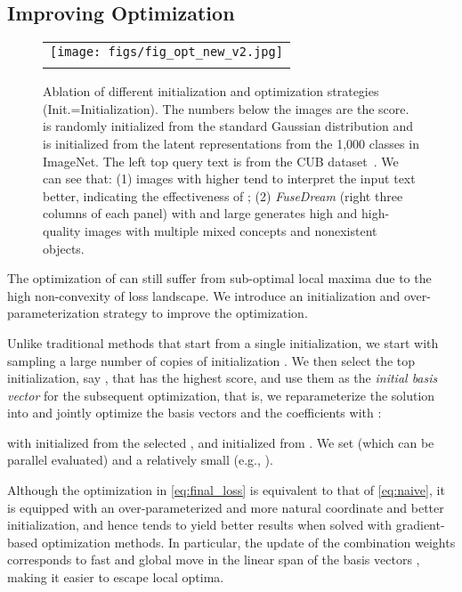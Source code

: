 \documentclass[10pt,twocolumn,letterpaper]{article}
\newcommand{\our}{\emph{FuseDream}}
\begin{document}
\subsection{Improving Optimization}
\label{subsec:strategy}
\begin{figure*}
    \centering
    \begin{tabular}{c} 
    \texttt{[image: figs/fig\_opt\_new\_v2.jpg]} \\
    \vspace{-15pt}
    \end{tabular}
\caption{
Ablation of different initialization and optimization strategies (Init.=Initialization). 
The numbers below the images are the   score.
 is randomly initialized from the standard Gaussian distribution and  is initialized from the latent representations from the 1,000 classes in ImageNet.
The left top query text is from the CUB dataset~\cite{welinder2010caltech}. 
We can see that: 
(1) images with higher   tend to  interpret the input text better,  indicating the effectiveness of ; 
(2) {\our} (right three columns of each panel) 
with  and large  generates high  and high-quality images with multiple mixed concepts and nonexistent objects.
}
    \label{fig:opt}
\end{figure*}
The optimization 
of  can still suffer from sub-optimal local maxima 
due to the high non-convexity of loss landscape. 
We introduce 
an initialization and over-parameterization strategy to 
  improve the optimization.  



Unlike traditional methods that start from a single initialization,
we start with sampling a large number  of copies of initialization  . We then select the top  initialization, say , that has the highest  score,  and use them as the \emph{initial basis vector} for the subsequent optimization, that is, we reparameterize the solution into  and jointly optimize the basis vectors  and the coefficients  with : 

with  initialized from 
the   selected , and  initialized from . 
We set  (which can be parallel evaluated)  and a relatively small  (e.g., ).


 Although the optimization in \eqref{eq:final_loss} is equivalent to that of \eqref{eq:naive}, 
 it is equipped with an 
 over-parameterized and 
 more natural coordinate and better initialization, 
and hence tends to yield better results 
 when solved with gradient-based optimization methods. In particular, 
 the update of the combination weights  
 corresponds to fast and global move in 
the linear span  
 of the basis vectors , 
 making it easier to escape local optima. 
\end{document}
